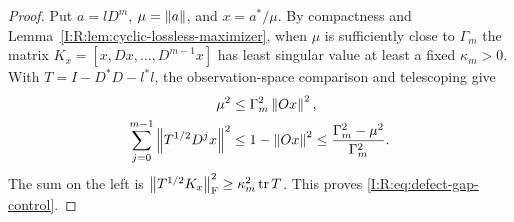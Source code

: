 \begin{proof}
Put $a=lD^m$, $\mu=\left\lVert a\right\rVert$, and $x=a^*/\mu$.
By compactness and Lemma~\ref{I:R:lem:cyclic-lossless-maximizer}, when
$\mu$ is sufficiently close to $\Gamma_m$ the matrix
$K_x=[x,Dx,\ldots,D^{m-1}x]$ has least singular value at least a fixed
$\kappa_m>0$.  With $T=I-D^*D-l^*l$, the observation-space comparison
and telescoping give
\begin{align*}
 \mu^2&\le\Gamma_m^2\left\lVert Ox\right\rVert^2,\\
 \sum_{j=0}^{m-1}\left\lVert T^{1/2}D^jx\right\rVert^2
 &\le1-\left\lVert Ox\right\rVert^2
 \le\frac{\Gamma_m^2-\mu^2}{\Gamma_m^2}.
\end{align*}
The sum on the left is
$\left\lVert T^{1/2}K_x\right\rVert_{\mathrm F}^2\ge\kappa_m^2\operatorname{tr}T$.
This proves \eqref{I:R:eq:defect-gap-control}.
\end{proof}
